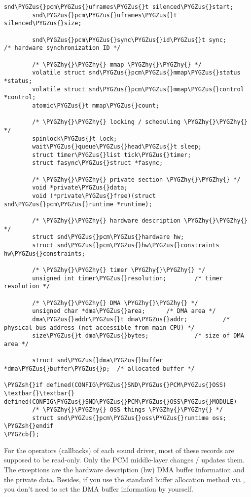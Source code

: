 \documentclass[a4paper,8pt,english]{sphinxmanual}
\def\PYGZus{\char`\_}
\def\PYGZcb{\char`\}}
\def\PYGZsh{\char`\#}
\def\PYGZhy{\char`\-}
\begin{document}
\begin{Verbatim}[commandchars=\\\{\}]
        snd\PYGZus{}pcm\PYGZus{}uframes\PYGZus{}t silenced\PYGZus{}start;
        snd\PYGZus{}pcm\PYGZus{}uframes\PYGZus{}t silenced\PYGZus{}size;

        snd\PYGZus{}pcm\PYGZus{}sync\PYGZus{}id\PYGZus{}t sync;               /* hardware synchronization ID */

        /* \PYGZhy{}\PYGZhy{} mmap \PYGZhy{}\PYGZhy{} */
        volatile struct snd\PYGZus{}pcm\PYGZus{}mmap\PYGZus{}status *status;
        volatile struct snd\PYGZus{}pcm\PYGZus{}mmap\PYGZus{}control *control;
        atomic\PYGZus{}t mmap\PYGZus{}count;

        /* \PYGZhy{}\PYGZhy{} locking / scheduling \PYGZhy{}\PYGZhy{} */
        spinlock\PYGZus{}t lock;
        wait\PYGZus{}queue\PYGZus{}head\PYGZus{}t sleep;
        struct timer\PYGZus{}list tick\PYGZus{}timer;
        struct fasync\PYGZus{}struct *fasync;

        /* \PYGZhy{}\PYGZhy{} private section \PYGZhy{}\PYGZhy{} */
        void *private\PYGZus{}data;
        void (*private\PYGZus{}free)(struct snd\PYGZus{}pcm\PYGZus{}runtime *runtime);

        /* \PYGZhy{}\PYGZhy{} hardware description \PYGZhy{}\PYGZhy{} */
        struct snd\PYGZus{}pcm\PYGZus{}hardware hw;
        struct snd\PYGZus{}pcm\PYGZus{}hw\PYGZus{}constraints hw\PYGZus{}constraints;

        /* \PYGZhy{}\PYGZhy{} timer \PYGZhy{}\PYGZhy{} */
        unsigned int timer\PYGZus{}resolution;        /* timer resolution */

        /* \PYGZhy{}\PYGZhy{} DMA \PYGZhy{}\PYGZhy{} */
        unsigned char *dma\PYGZus{}area;      /* DMA area */
        dma\PYGZus{}addr\PYGZus{}t dma\PYGZus{}addr;          /* physical bus address (not accessible from main CPU) */
        size\PYGZus{}t dma\PYGZus{}bytes;             /* size of DMA area */

        struct snd\PYGZus{}dma\PYGZus{}buffer *dma\PYGZus{}buffer\PYGZus{}p;  /* allocated buffer */

\PYGZsh{}if defined(CONFIG\PYGZus{}SND\PYGZus{}PCM\PYGZus{}OSS) \textbar{}\textbar{} defined(CONFIG\PYGZus{}SND\PYGZus{}PCM\PYGZus{}OSS\PYGZus{}MODULE)
        /* \PYGZhy{}\PYGZhy{} OSS things \PYGZhy{}\PYGZhy{} */
        struct snd\PYGZus{}pcm\PYGZus{}oss\PYGZus{}runtime oss;
\PYGZsh{}endif
\PYGZcb{};
\end{Verbatim}

For the operators (callbacks) of each sound driver, most of these
records are supposed to be read-only. Only the PCM middle-layer changes
/ updates them. The exceptions are the hardware description (hw) DMA
buffer information and the private data. Besides, if you use the
standard buffer allocation method via
, you don't need to set the
DMA buffer information by yourself.
\end{document}
